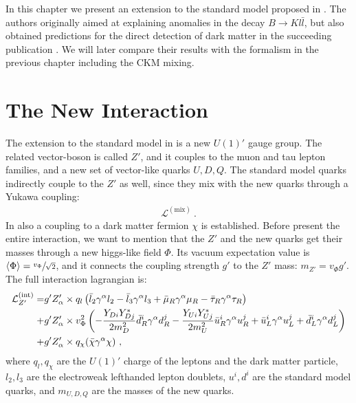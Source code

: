 In this chapter we present an extension to the standard model proposed in \cite{InColour}. The authors originally aimed at explaining anomalies in the decay $B\rightarrow Kl\bar{l}$, but also obtained predictions for the direct detection of dark matter in the succeeding publication \cite{Z}. We will later compare their results with the formalism in the previous chapter including the CKM mixing.

\section{The New Interaction}
The extension to the standard model in \cite{InColour} is a new $U(1)'$ gauge group. The related vector-boson is called $Z'$, and it couples to the muon and tau lepton families, and a new set of vector-like quarks $U,D,Q$. The standard model quarks indirectly couple to the $Z'$ as well, since they mix with the new quarks through a Yukawa coupling:
\begin{align}
	\mathcal{L}^{(\text{mix})} \ .
\end{align}
In \cite{Z} also a coupling to a dark matter fermion $\chi$ is established. Before present the entire interaction, we want to mention that the $Z'$ and the new quarks get their masses through a new higgs-like field $\Phi$. Its vacuum expectation value is $\langle\Phi\rangle=\sfrac{v_\Phi}{\sqrt{2}}$, and it connects the coupling strength $g'$ to the $Z'$ mass: $m_{Z'} = v_\Phi g'$. The full interaction lagrangian is:
\begin{align}
	\mathcal{L}^{(\text{int})}_{Z'} = &g'Z_\alpha'\times q_l\left(\bar{l}_2\gamma^\alpha l_2 - \bar{l}_3\gamma^\alpha l_3 + \bar{\mu}_R\gamma^\alpha\mu_R-\bar{\tau}_R\gamma^\alpha\tau_R\right)\notag \\
	+&g'Z_\alpha'\times v_\Phi^2\left(-\frac{Y_{Di}Y^*_{Dj}}{2m_D^2}\bar{d}_R^i\gamma^\alpha d_R^j - \frac{Y_{Ui}Y^*_{Uj}}{2m_U^2}\bar{u}_R^i\gamma^\alpha u_R^j + \bar{u}_L^i\gamma^\alpha u_L^j + \bar{d}_L^i\gamma^\alpha d_L^j\right)\notag \\
	+&g'Z_\alpha'\times q_\chi(\bar{\chi}\gamma^\alpha\chi) \ ,
\end{align}
where $q_l,q_\chi$ are the $U(1)'$ charge of the leptons and the dark matter particle, $l_2,l_3$ are the electroweak lefthanded lepton doublets, $u^i,d^i$ are the standard model quarks, and $m_{U,D,Q}$ are the masses of the new quarks.



